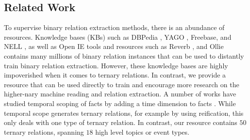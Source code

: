 

%
% 
%  
  
  \subsection{Related Work}
  To supervise binary relation extraction methods,  there is an abundance  of resources. Knowledge bases (KBs) such as  DBPedia \cite{Auer07}, YAGO \cite{suchanek2007yago}, Freebase\cite{Bollacker2008}, and NELL \cite{MitchellCHTBCMG15}, as well as Open IE tools and resources such as Reverb \cite{Fader2011}, and Ollie \cite{Mausam2012} contains many millions of binary relation instances that can be used  to distantly train binary relation extraction. However, these knowledge bases are highly impoverished when it comes to ternary relations.  In contrast, we provide a resource that can be used directly to train and encourage more research on the higher-nary machine reading and relation extraction. A number of works have studied temporal scoping of  facts by adding a time dimension to facts \cite{wang2010timely,wijayactp}. While temporal scope generates ternary relations, for example by using reification, this only deals with one type of ternary relation. In contrast, our resource contains $50$ ternary relations, spanning $18$ high level topics or  event types.
  
